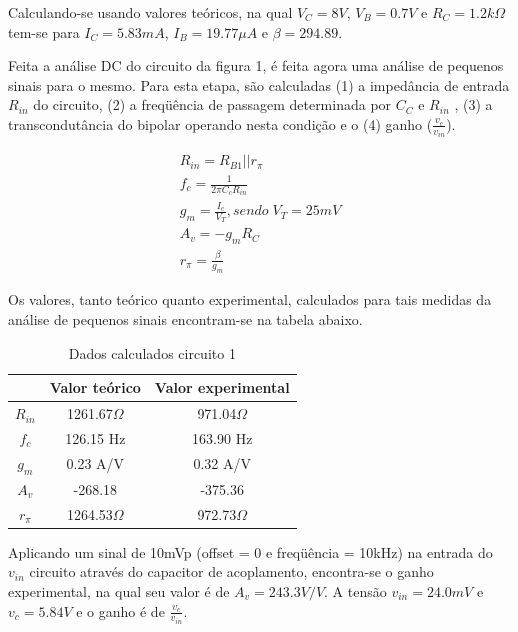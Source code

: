 \documentclass[a4paper]{article} %
\begin{document}
Calculando-se usando valores teóricos, na qual $V_C=8V$, $V_B=0.7V$ e $R_C=1.2k\Omega$
tem-se para  $I_C=5.83mA$, $I_B=19.77\mu A$ e $\beta=294.89$.

Feita a análise DC do circuito da figura 1, é feita agora uma análise de pequenos sinais
para o mesmo. Para esta etapa, são calculadas (1) a impedância de entrada $R_{in}$
do circuito, (2) a freqüência de passagem determinada por $C_C$ e $R_{in}$ , (3) a transcondutância do bipolar
operando nesta condição e o (4) ganho ($\frac{v_c}{v_{in}}$).




\vspace{3mm}


\begin{eqnarray}
R_{in}=R_{B1}||r_{\pi}\\
f_c=\frac{1}{2\pi C_cR_{in}}\\
g_m=\frac{I_c}{V_T},sendo \; V_T = 25 mV\\
A_v=-g_mR_C\\
r_{\pi}=\frac{\beta}{g_m}
\end{eqnarray}


Os valores, tanto teórico quanto experimental, calculados para tais medidas da análise
de pequenos sinais encontram-se na tabela abaixo.
\begin{table}[h!]
\begin{centering}
\begin{tabular}{ccc}
\hline 
 & Valor teórico & Valor experimental\tabularnewline
\hline
\hline 
$R_{in}$ & 1261.67$\Omega$ & 971.04$\Omega$\tabularnewline
$f_{c}$ & 126.15 Hz & 163.90 Hz\tabularnewline
$g_{m}$ & 0.23 A/V & 0.32 A/V\tabularnewline
$A_{v}$ & -268.18 & -375.36\tabularnewline
$r_{\pi}$ & 1264.53$\Omega$ & 972.73$\Omega$\tabularnewline
\hline
\end{tabular}
\par\end{centering}

\caption{Dados calculados circuito 1}

\end{table}


Aplicando um sinal de 10mVp (offset = 0 e freqüência = 10kHz) na entrada
do $v_{in}$
circuito através do capacitor de acoplamento, encontra-se o ganho experimental, na
qual seu valor é de $A_v=243.3 V/V$. A tensão $v_{in}=24.0mV$ e $v_c=5.84V$
e o ganho é de $\frac{v_c}{v_{in}}$.
\end{document}
